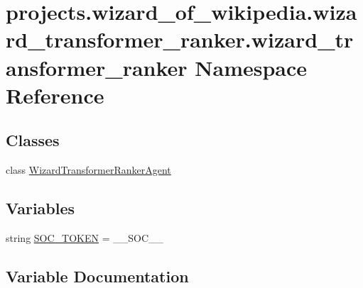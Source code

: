 \hypertarget{namespaceprojects_1_1wizard__of__wikipedia_1_1wizard__transformer__ranker_1_1wizard__transformer__ranker}{}\section{projects.\+wizard\+\_\+of\+\_\+wikipedia.\+wizard\+\_\+transformer\+\_\+ranker.\+wizard\+\_\+transformer\+\_\+ranker Namespace Reference}
\label{namespaceprojects_1_1wizard__of__wikipedia_1_1wizard__transformer__ranker_1_1wizard__transformer__ranker}
\subsection*{Classes}
\begin{DoxyCompactItemize}
\item 
class \hyperlink{classprojects_1_1wizard__of__wikipedia_1_1wizard__transformer__ranker_1_1wizard__transformer__rad02f16524e5e0423aa3e2c69e1330ee1}{Wizard\+Transformer\+Ranker\+Agent}
\end{DoxyCompactItemize}
\subsection*{Variables}
\begin{DoxyCompactItemize}
\item 
string \hyperlink{namespaceprojects_1_1wizard__of__wikipedia_1_1wizard__transformer__ranker_1_1wizard__transformer__ranker_a38b93138f44da8be03877719652d12e7}{S\+O\+C\+\_\+\+T\+O\+K\+EN} = \textquotesingle{}\+\_\+\+\_\+\+S\+O\+C\+\_\+\+\_\+\textquotesingle{}
\end{DoxyCompactItemize}


\subsection{Variable Documentation}
\mbox{\label{namespaceprojects_1_1wizard__of__wikipedia_1_1wizard__transformer__ranker_1_1wizard__transformer__ranker_a38b93138f44da8be03877719652d12e7}} 
